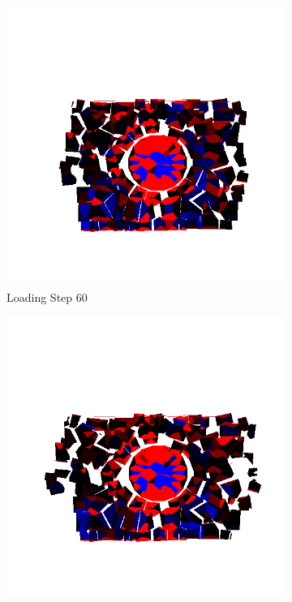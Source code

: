 \begin{figure}[ht!]
    \begin{subfigure}{.33\textwidth}
      \centering
      \includegraphics[width=1.0\linewidth]{Files/Small_ASR/IS2/DEP5-STEP(080).png}
      \caption{Loading Step 60}
    \end{subfigure}%
    \begin{subfigure}{.33\textwidth}
      \centering
      \includegraphics[width=1.0\linewidth]{Files/Small_ASR/IS2/DEP5-STEP(100).png}

\end{subfigure}
\end{figure}
